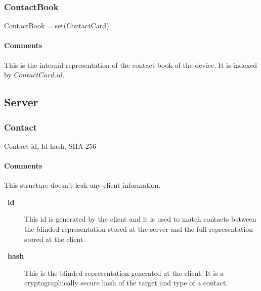 \documentclass[a4paper,10pt]{article}
\let\Item\item
\newcommand\SpecialItem{\renewcommand\item[1][]{\Item[\textbullet~\bfseries##1]}
}
\begin{document}
\subsubsection{ContactBook}

\begin{verbbox}
ContactBook = set(ContactCard)
\end{verbbox}
\begin{center}
\theverbbox
\end{center}

\begin{inparaitem}[ ]
 \item \persistent
 \item \unsecure
 \item \unique
\end{inparaitem}

\paragraph*{Comments}
This is the internal representation of the contact book of the device. It is indexed by $ContactCard.id$.

\subsection{Server}
\label{sec:structure:server}

\subsubsection{Contact}
\label{sec:structure:server:contact}

\begin{verbbox}
Contact
{
  id, Id
  hash, SHA-256
}
\end{verbbox}
\begin{center}
\theverbbox
\end{center}

\begin{inparaitem}[ ]
 \item \infrastructure
\end{inparaitem}

\paragraph*{Comments}
This structure doesn't leak any client information.

\SpecialItem
\begin{description}
 \item[id] This id is generated by the client and it is used to match contacts between the blinded representation stored at the server and the full representation stored at the 
client.
 \item[hash] This is the blinded representation generated at the client. It is a cryptographically secure hash of the target and type of a contact.
\end{description}
\end{document}
